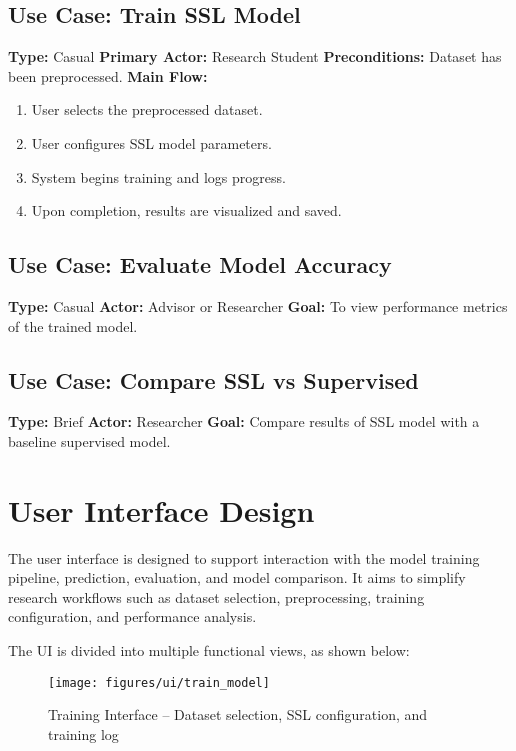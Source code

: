 \subsection*{Use Case: Train SSL Model}
\textbf{Type:} Casual
\textbf{Primary Actor:} Research Student
\textbf{Preconditions:} Dataset has been preprocessed.
\textbf{Main Flow:}
\begin{enumerate}
    \item User selects the preprocessed dataset.
    \item User configures SSL model parameters.
    \item System begins training and logs progress.
    \item Upon completion, results are visualized and saved.
\end{enumerate}

\subsection*{Use Case: Evaluate Model Accuracy}
\textbf{Type:} Casual
\textbf{Actor:} Advisor or Researcher
\textbf{Goal:} To view performance metrics of the trained model.

\subsection*{Use Case: Compare SSL vs Supervised}
\textbf{Type:} Brief
\textbf{Actor:} Researcher
\textbf{Goal:} Compare results of SSL model with a baseline supervised model.

\section{User Interface Design}
\label{section:user-interface-design}

The user interface is designed to support interaction with the model training pipeline, prediction, evaluation, and model comparison. It aims to simplify research workflows such as dataset selection, preprocessing, training configuration, and performance analysis.

The UI is divided into multiple functional views, as shown below:

\begin{figure}[H]
    \centering
    \texttt{[image: figures/ui/train\_model]}
    \caption{Training Interface – Dataset selection, SSL configuration, and training log}
\end{figure}

